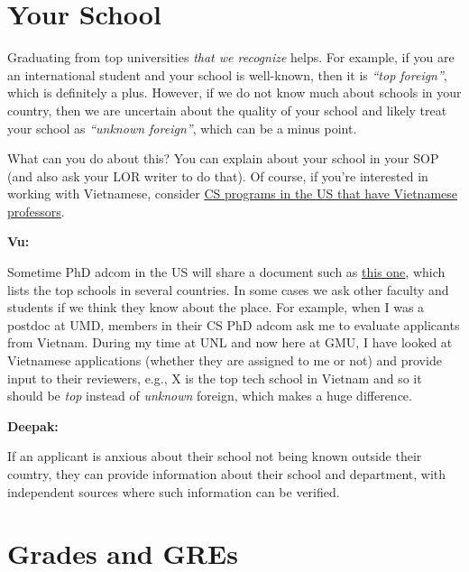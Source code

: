 \documentclass[oneside,11pt]{memoir}
\newenvironment{commentbox}[1][]{
  \small
  \begin{mybox}
    {\small \textbf{#1}}
  }{
  \end{mybox}
}
\begin{document}
\section{Your School}\label{sec:your-school}

Graduating from top universities \emph{that we recognize} helps. For example, if you are an international student and your school is well-known, then it is \emph{``top foreign''}, which is definitely a plus.
However, if we do not know much about schools in your country, then we are uncertain about the quality of your school and  likely treat your school as \emph{``unknown foreign''}, which can be a minus point.


What can you do about this? You can explain about your school in your SOP (and also ask your LOR writer to do that). Of course, if you're interested in working with Vietnamese, consider  \href{https://github.com/dynaroars/dynaroars.github.io/wiki/Viet-CS-Profs-US}{CS programs in the US that have Vietnamese professors}. %

\begin{commentbox}[Vu:]
  Sometime PhD adcom in the US will share a document such as \href{https://github.com/dynaroars/dynaroars.github.io/wiki/Foreign-Top-Schools}{this one}, which lists the top schools in several countries. In some cases we ask other faculty and students if we think they know about the place.  For example, when I was a postdoc at UMD, members in their CS PhD adcom ask me to evaluate applicants from Vietnam.  During my time at UNL and now here at GMU, I have looked at Vietnamese applications (whether they are assigned to me or not) and provide input to their reviewers, e.g., X is the top tech school in Vietnam and so it should be \emph{top} instead of \emph{unknown} foreign, which makes a huge difference.
\end{commentbox}
\begin{commentbox}[Deepak:] 
  If an applicant is anxious about their school not being known outside their country, they can provide information about their school and department, with independent sources where such information can be verified.
\end{commentbox}

\section{Grades and GREs}\label{sec:grades}
\end{document}
